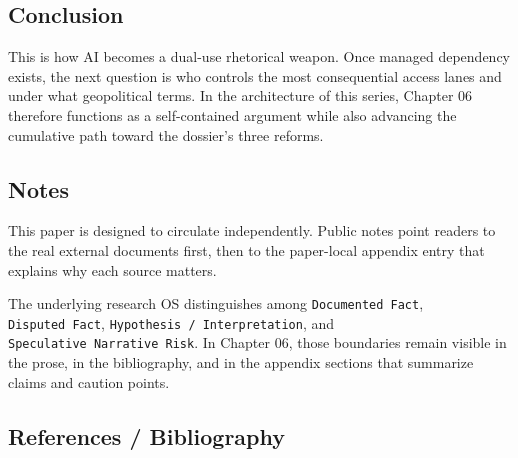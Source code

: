 \documentclass[
  american,
  11pt,
  letterpaper,
]{article}
\begin{document}
\subsection{Conclusion}\label{conclusion-6}

This is how AI becomes a dual-use rhetorical weapon. Once managed
dependency exists, the next question is who controls the most
consequential access lanes and under what geopolitical terms. In the
architecture of this series, Chapter 06 therefore functions as a
self-contained argument while also advancing the cumulative path toward
the dossier's three reforms.

\subsection{Notes}\label{notes-6}

This paper is designed to circulate independently. Public notes point
readers to the real external documents first, then to the paper-local
appendix entry that explains why each source matters.

The underlying research OS distinguishes among
\texttt{Documented\ Fact}, \texttt{Disputed\ Fact},
\texttt{Hypothesis\ /\ Interpretation}, and
\texttt{Speculative\ Narrative\ Risk}. In Chapter 06, those boundaries
remain visible in the prose, in the bibliography, and in the appendix
sections that summarize claims and caution points.

\subsection{References / Bibliography}\label{references-bibliography-6}
\end{document}
